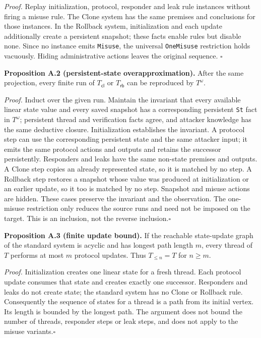 \emph{Proof.} Replay initialization, protocol, responder and leak rule
instances without firing a misuse rule. The Clone system has the same
premises and conclusions for those instances. In the Rollback system,
initialization and each update additionally create a persistent snapshot;
these facts enable rules but disable none. Since no instance emits
\texttt{Misuse}, the universal \texttt{OneMisuse} restriction holds
vacuously. Hiding administrative actions leaves the original sequence.
\hfill$\square$

\noindent\textbf{Proposition A.2 (persistent-state overapproximation).}
After the same projection, every finite run of $T_{\mathsf{cl}}$ or
$T_{\mathsf{rb}}$ can be reproduced by $T^{\omega}$.

\emph{Proof.} Induct over the given run. Maintain the invariant that
every available linear state value and every saved snapshot has a
corresponding persistent \texttt{St} fact in $T^{\omega}$; persistent
thread and verification facts agree, and attacker knowledge has the same
deductive closure. Initialization establishes the invariant. A protocol
step can use the corresponding persistent state and the same attacker
input; it emits the same protocol actions and outputs and retains the
successor persistently. Responders and leaks have the same non-state
premises and outputs. A Clone step copies an already represented state,
so it is matched by no step. A Rollback step restores a snapshot whose
value was produced at initialization or an earlier update, so it too is
matched by no step. Snapshot and misuse actions are hidden. These cases
preserve the invariant and the observation. The one-misuse restriction
only reduces the source runs and need not be imposed on the target.
This is an inclusion, not the reverse inclusion.\hfill$\square$

\noindent\textbf{Proposition A.3 (finite update bound).}
If the reachable state-update graph of the standard system is acyclic
and has longest path length $m$, every thread of $T$ performs at most
$m$ protocol updates. Thus $T_{\le n}=T$ for $n\ge m$.

\emph{Proof.} Initialization creates one linear state for a fresh
thread. Each protocol update consumes that state and creates exactly
one successor. Responders and leaks do not create state; the standard
system has no Clone or Rollback rule. Consequently the sequence of
states for a thread is a path from its initial vertex. Its length is
bounded by the longest path. The argument does not bound the number of
threads, responder steps or leak steps, and does not apply to the
misuse variants.\hfill$\square$

